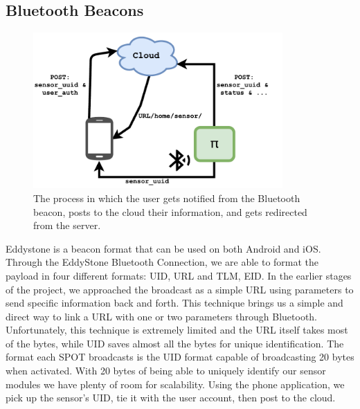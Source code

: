 \subsection{Bluetooth Beacons}
\begin{figure}[ht!]
\centering
\includegraphics[width=0.85\textwidth]{pictures/BluetoothBeacon.pdf}
\caption{The process in which the user gets notified from the Bluetooth beacon, posts to the cloud their information, and gets redirected from the server.}
\end{figure}
Eddystone is a beacon format that can be used on both Android and iOS. 
Through the EddyStone Bluetooth Connection, we are able to format the payload in four different formats: UID, URL and TLM, EID. 
In the earlier stages of the project, we approached the broadcast as a simple URL using parameters to send specific information back and forth. 
This technique brings us a simple and direct way to link a URL with one or two parameters through Bluetooth. 
Unfortunately, this technique is extremely limited and the URL itself takes most of the bytes, while UID saves almost all the bytes for unique identification. 
The format each SPOT broadcasts is the UID format capable of broadcasting 20 bytes when activated.
With 20 bytes of being able to uniquely identify our sensor modules we have plenty of room for scalability. 
Using the phone application, we pick up the sensor's UID, tie it with the user account, then post to the cloud.


